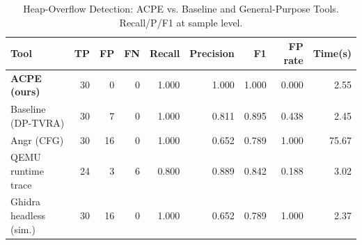 \begin{table}[t]
\centering
\caption{Heap-Overflow Detection: ACPE vs. Baseline and General-Purpose Tools. Recall/P/F1 at sample level.}
\label{tab:acpe-comparison}
\small
\begin{tabular}{lrrrrrrrr}
\hline
Tool & TP & FP & FN & Recall & Precision & F1 & FP rate & Time(s) \\
\hline
  \textbf{ACPE (ours)} & 30 & 0 & 0 & 1.000 & 1.000 & 1.000 & 0.000 & 2.55 \\
  Baseline (DP-TVRA) & 30 & 7 & 0 & 1.000 & 0.811 & 0.895 & 0.438 & 2.45 \\
  Angr (CFG) & 30 & 16 & 0 & 1.000 & 0.652 & 0.789 & 1.000 & 75.67 \\
  QEMU runtime trace & 24 & 3 & 6 & 0.800 & 0.889 & 0.842 & 0.188 & 3.02 \\
  Ghidra headless (sim.) & 30 & 16 & 0 & 1.000 & 0.652 & 0.789 & 1.000 & 2.37 \\
\hline
\end{tabular}
\end{table}